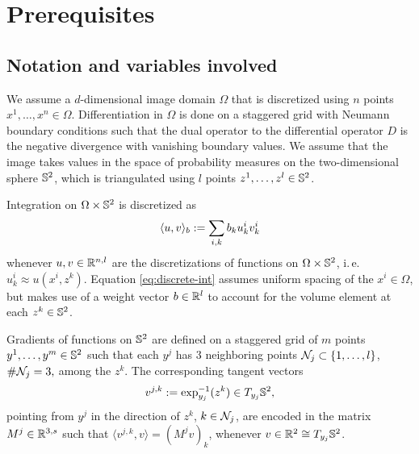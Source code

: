 
\section{Prerequisites}

\subsection{Notation and variables involved}

We assume a $d$-dimensional image domain $\Omega$ that is discretized using
$n$ points $x^1, \dots, x^n \in \Omega$.
Differentiation in $\Omega$ is done on a staggered grid with Neumann boundary
conditions such that the dual operator to the differential operator $D$ is the
negative divergence with vanishing boundary values.
We assume that the image takes values in the space of probability measures on
the two-dimensional sphere $\mathbb{S}^2$, which is triangulated using $l$ points
$z^1, \dots, z^l \in \mathbb{S}^2$. 

Integration on $\Omega \times \mathbb{S}^2$ is discretized as
\begin{equation}\label{eq:discrete-int}
    \langle u, v \rangle_b := \sum_{i,k} b_{k} u_k^i v_k^i
    \vspace{-7.5pt}
\end{equation}
whenever $u,v \in \mathbb{R}^{n,l}$ are the discretizations of functions on
$\Omega \times \mathbb{S}^2$, i.\,e. $u_k^i \approx u(x^i,z^k)$.
Equation \eqref{eq:discrete-int} assumes uniform spacing of the $x^i \in \Omega$,
but makes use of a weight vector $b \in \mathbb{R}^l$ to account for the volume element
at each $z^k \in \mathbb{S}^2$.

Gradients of functions on $\mathbb{S}^2$ are defined on a staggered grid of $m$ points
$y^1, \dots, y^m \in \mathbb{S}^2$ such that each $y^j$ has $3$ neighboring points $
    \mathcal{N}_j \subset \{1, \dots, l\}$, $\#\mathcal{N}_j = 3,
$ among the $z^k$.
The corresponding tangent vectors
\begin{equation}
    v^{j,k} := \exp^{-1}_{y_j}(z^k) \in T_{y_j}\mathbb{S}^2,
\end{equation}
pointing from $y^j$ in the direction of $z^k$, $k \in \mathcal{N}_j$, are encoded in
the matrix $M^j \in \mathbb{R}^{3,s}$ such that $
    \langle v^{j,k}, v \rangle = (M^j v)_k
$, whenever $v \in \mathbb{R}^2 \cong T_{y_j}\mathbb{S}^2$.

